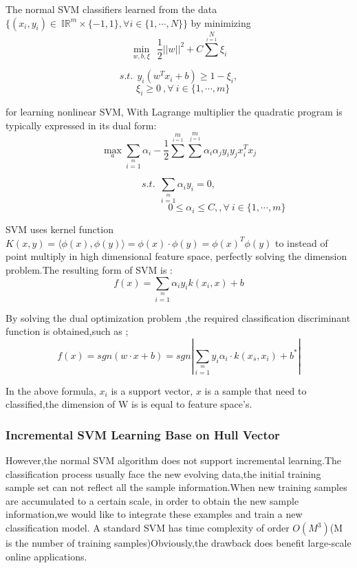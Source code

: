\documentclass[a4paper]{article}
\begin{document}
The normal SVM classifiers learned from the data $\{ (x_i,y_i)\in\ \mathbb{IR}^m \times \{ -1, 1 \} ,\forall i \in \{ 1,\cdots,N \} \}$ by minimizing
\begin{equation}
\min \limits_{w,b,\xi} \ \ \frac{1}{2}||w||^2+C\sum^{N} \limits_{i=1}\xi_i \tag{1}
\end{equation}


$$
s.t. \ \ y_i(w^T x_i + b)\geq 1-\xi_i,
$$
$$
\ \ \ \ \xi_i \geq  0 \ ,\forall \ i \in \{1,\cdots,m\}
$$

for learning nonlinear SVM, With Lagrange multiplier the quadratic program is typically expressed in its dual form:
\begin{equation}
\max_a  \sum_{i=1}\limits^{m} \alpha_i - \frac{1}{2} \sum \limits^{m} \limits_{i=1} \sum \limits^{m} \limits_{j=1} \alpha_i \alpha_j y_i y_j x_i^T x_j \tag{2}
\end{equation}

$$
s.t. \ \ \sum \limits_{i=1} \limits^{m} \alpha_i y_i = 0 ,
$$
$$
     \qquad \qquad \qquad \qquad \qquad 0\leq \alpha_i \leq C, ,\forall \ i \in \{1,\cdots,m\}
$$

SVM uses kernel function  $K(x,y)= \langle\phi(x) , \phi(y)\rangle =\phi(x) \cdot \phi(y) = \phi(x)^T  \phi(y)$  to instead of point multiply in high dimensional feature space, perfectly solving the dimension problem.The resulting form of SVM is :
\begin{equation}
f(x) = \sum \limits_{i=1} \limits^{m} \alpha_i y_i k(x_i,x) + b \tag{3}
\end{equation}

By solving the dual optimization problem ,the required classification discriminant function is obtained,such as ;
\begin{equation}
f(x) = sgn( w \cdot x + b ) = sgn \left|\sum \limits_{i=1} \limits^{m} y_i \alpha_i \cdot k(x_s,x_i)+b^*  \right|   \tag{4}
\end{equation}

In the above formula, $x_i$ is a support vector, $x$ is a sample that need to classified,the dimension of W is is equal to feature space's.

    \subsubsection{Incremental SVM Learning Base on Hull Vector}

However,the normal SVM algorithm does not support incremental learning.The classification process usually face the new evolving data,the initial training sample set can not reflect all the sample information.When new training samples are accumulated to a certain scale, in order to obtain the new sample information,we would like to integrate these examples and train a new classification model.
A standard SVM has time complexity of order $O(M^3)$(M is the number of training samples)Obviously,the drawback does benefit large-scale online applications.
\end{document}
